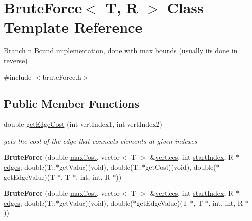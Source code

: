 \hypertarget{class_brute_force}{}\section{Brute\+Force$<$ T, R $>$ Class Template Reference}
\label{class_brute_force}


Branch n Bound implementation, done with max bounds (usually it\textquotesingle{}s done in reverse)  




{\ttfamily \#include $<$brute\+Force.\+h$>$}

\subsection*{Public Member Functions}
\begin{DoxyCompactItemize}
\item 
double \hyperlink{class_brute_force_adb9075a2004631bb5c9b84be4d9db703}{get\+Edge\+Cost} (int vert\+Index1, int vert\+Index2)
\begin{DoxyCompactList}\small\item\em gets the cost of the edge that connects elements at given indexes \end{DoxyCompactList}\item 
\hypertarget{class_brute_force_aea1cc0269b2721549509a568d4c10673}{}{\bfseries Brute\+Force} (double \hyperlink{class_brute_force_ae66347aacfd3475ef265f17b0df1df4d}{max\+Cost}, vector$<$ T $>$ \&\hyperlink{class_brute_force_a0396c2f7b943c2894ce9fe8c11737030}{vertices}, int \hyperlink{class_brute_force_a11c645961c0bf974d5da32dfbc0c07e0}{start\+Index}, R $\ast$\hyperlink{class_brute_force_a183a96de9d3c8541e387bea53cffa8ed}{edges}, double(T\+::$\ast$get\+Value)(void), double(T\+::$\ast$get\+Cost)(void), double($\ast$get\+Edge\+Value)(T $\ast$, T $\ast$, int, int, R $\ast$))\label{class_brute_force_aea1cc0269b2721549509a568d4c10673}

\item 
\hypertarget{class_brute_force_a9c90b52c13425dd6307ba17b98f43697}{}{\bfseries Brute\+Force} (double \hyperlink{class_brute_force_ae66347aacfd3475ef265f17b0df1df4d}{max\+Cost}, vector$<$ T $>$ \&\hyperlink{class_brute_force_a0396c2f7b943c2894ce9fe8c11737030}{vertices}, int \hyperlink{class_brute_force_a11c645961c0bf974d5da32dfbc0c07e0}{start\+Index}, R $\ast$\hyperlink{class_brute_force_a183a96de9d3c8541e387bea53cffa8ed}{edges}, double(T\+::$\ast$get\+Value)(void), double($\ast$get\+Edge\+Value)(T $\ast$, T $\ast$, int, int, R $\ast$))\label{class_brute_force_a9c90b52c13425dd6307ba17b98f43697}


\end{DoxyCompactItemize}
